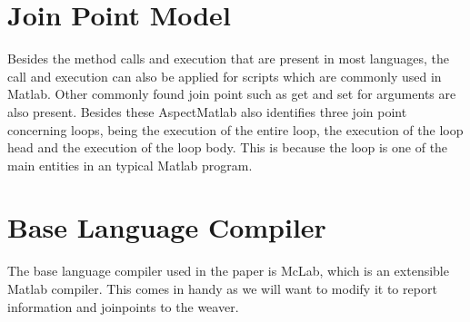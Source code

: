 \documentclass[a4paper]{report}
\begin{document}
\section{Join Point Model}
Besides the method calls and execution that are present in most languages, the call and execution can also be applied for scripts which are commonly used in Matlab. Other commonly found join point such as get and set for arguments are also present. Besides these AspectMatlab also identifies three join point concerning loops, being the execution of the entire loop, the execution of the loop head and the execution of the loop body. This is because the loop is one of the main entities in an typical Matlab program.

\section{Base Language Compiler}
The base language compiler used in the paper is McLab, which is an extensible Matlab compiler. This comes in handy as we will want to modify it to report information and joinpoints to the weaver.
\end{document}
